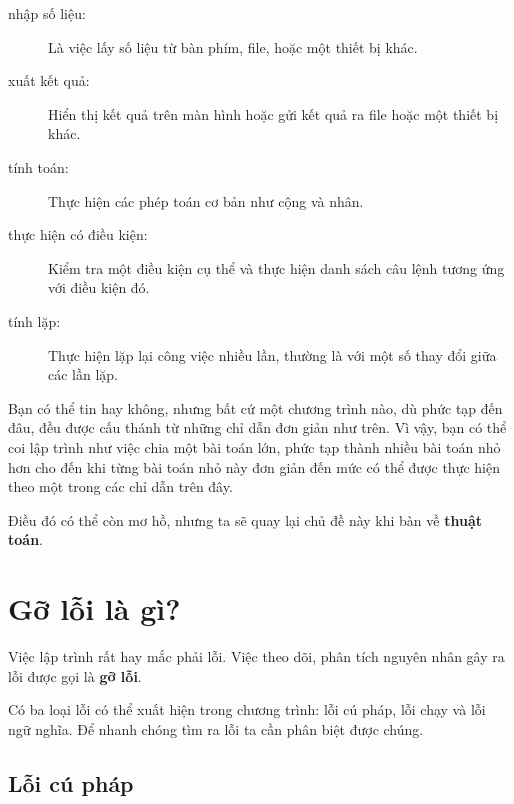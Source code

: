 \documentclass[11pt]{book}
\begin{document}
\begin{description}

\item[nhập số liệu:] Là việc lấy số liệu từ bàn phím, file, hoặc một thiết bị khác.

\item[xuất kết quả:] Hiển thị kết quả trên màn hình hoặc gửi kết quả ra file
hoặc một thiết bị khác.

\item[tính toán:] Thực hiện các phép toán cơ bản như cộng và nhân.

\item[thực hiện có điều kiện:] Kiểm tra một điều kiện
cụ thể và thực hiện danh sách câu lệnh tương ứng với điều kiện đó.

\item[tính lặp:] Thực hiện lặp lại công việc nhiều lần, thường là với
một số thay đổi giữa các lần lặp.

\end{description}

Bạn có thể tin hay không, nhưng bất cứ một chương trình nào, dù
phức tạp đến đâu, đều được cấu thánh từ những chỉ dẫn đơn giản như
trên. Vì vậy, bạn có thể coi lập trình như việc chia một bài toán lớn, phức
tạp thành nhiều bài toán nhỏ hơn cho đến khi từng bài toán nhỏ này
đơn giản đến mức có thể được thực hiện theo một trong các chỉ dẫn
trên đây.


Điều đó có thể còn mơ hồ, nhưng ta sẽ quay lại chủ đề này khi 
bàn về \textbf{thuật toán}.

\section{Gỡ lỗi là gì?}

Việc lập trình rất hay mắc phải lỗi. Việc theo dõi, phân tích nguyên nhân
gây ra lỗi được gọi là {\bf gỡ lỗi}.


Có ba loại lỗi có thể xuất hiện trong chương trình: lỗi cú pháp, lỗi chạy
và lỗi ngữ nghĩa. Để nhanh chóng tìm ra lỗi ta cần phân biệt được chúng.

\subsection{Lỗi cú pháp}
\end{document}
